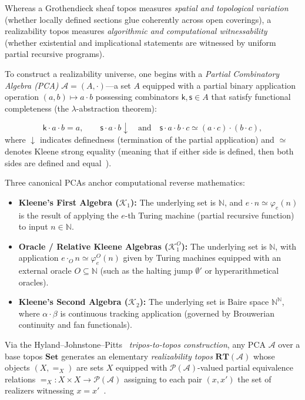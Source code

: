 Whereas a Grothendieck sheaf topos measures \emph{spatial and topological variation} (whether locally defined sections glue coherently across open coverings), a realizability topos measures \emph{algorithmic and computational witnessability} (whether existential and implicational statements are witnessed by uniform partial recursive programs).

To construct a realizability universe, one begins with a \emph{Partial Combinatory Algebra (PCA)} $\mathcal{A} = (A, \cdot)$---a set $A$ equipped with a partial binary application operation $(a, b) \mapsto a \cdot b$ possessing combinators $\mathsf{k}, \mathsf{s} \in A$ that satisfy functional completeness (the $\lambda$-abstraction theorem):

\[
  \mathsf{k} \cdot a \cdot b = a, \qquad \mathsf{s} \cdot a \cdot b \downarrow \quad \text{and} \quad \mathsf{s} \cdot a \cdot b \cdot c \simeq (a \cdot c) \cdot (b \cdot c),
\]
where $\downarrow$ indicates definedness (termination of the partial application) and $\simeq$ denotes Kleene strong equality (meaning that if either side is defined, then both sides are defined and equal~\cite[Ch.~1, \S\S 1.1--1.4]{vanOosten08}).

Three canonical PCAs anchor computational reverse mathematics:

\begin{itemize}

  \item \textbf{Kleene's First Algebra ($\mathcal{K}_1$):} The underlying set is $\mathbb{N}$, and $e \cdot n \simeq \varphi_e(n)$ is the result of applying the $e$-th Turing machine (partial recursive function) to input $n \in \mathbb{N}$.

  \item \textbf{Oracle / Relative Kleene Algebras ($\mathcal{K}_1^O$):} The underlying set is $\mathbb{N}$, with application $e \cdot_O n \simeq \varphi_e^O(n)$ given by Turing machines equipped with an external oracle $O \subseteq \mathbb{N}$ (such as the halting jump $\emptyset'$ or hyperarithmetical oracles).

  \item \textbf{Kleene's Second Algebra ($\mathcal{K}_2$):} The underlying set is Baire space $\mathbb{N}^\mathbb{N}$, where $\alpha \cdot \beta$ is continuous tracking application (governed by Brouwerian continuity and fan functionals).

\end{itemize}

Via the Hyland--Johnstone--Pitts~\cite[pp.~205--232]{HJP80} \emph{tripos-to-topos construction}, any PCA $\mathcal{A}$ over a base topos $\mathbf{Set}$ generates an elementary \emph{realizability topos} $\mathbf{RT}(\mathcal{A})$ whose objects $(X, =_X)$ are sets $X$ equipped with $\mathcal{P}(\mathcal{A})$-valued partial equivalence relations $=_X: X \times X \to \mathcal{P}(\mathcal{A})$ assigning to each pair $(x, x')$ the set of realizers witnessing $x = x'$~\cite[Ch.~2, \S\S 2.1--2.2]{vanOosten08}.

